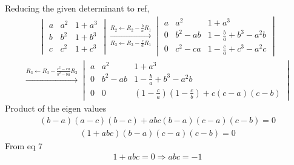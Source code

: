 \documentclass{beamer}
\theoremstyle{remark}
\newcommand{\mydet}[1]{\ensuremath{\begin{vmatrix}#1\end{vmatrix}}}
\numberwithin{equation}{section}
\begin{document}
Reducing the given determinant to ref,
\begin{align}
		\mydet{a &a^2 &1+ a^3\\ b & b^2 & 1 + b^3\\c & c^2 & 1 + c^3} \xrightarrow[R_3\leftarrow R_3-\frac{c}{a}R_1]{R_2\leftarrow R_2-\frac{b}{a}R_1} \mydet{a &a^2 &1+ a^3\\ 0 & b^2-ab & 1-\frac{b}{a} + b^3-a^2b\\0 & c^2-ca &1 -\frac{c}{a}  + c^3-a^2c }
\end{align}
\begin{align}
\xrightarrow[]{R_3\leftarrow R_3-\frac{c^2-ca}{b^2-ba}R_2} \mydet{a &a^2 &1+ a^3\\ 0 & b^2-ab & 1-\frac{b}{a} + b^3-a^2b\\0 & 0 & ( 1 -\frac{c}{a}) (1-\frac{c}{b})  + c(c-a)(c-b)}
\end{align}
Product of the eigen values 
\begin{align}
		(b-a)(a-c)(b-c)+abc(b-a)(c-a)(c-b) = 0 
\end{align}
\begin{align}
		(1+abc)(b-a)(c-a)(c-b) = 0 
\end{align}
From eq 7
\begin{align}
		1+abc = 0 \Rightarrow abc = -1 
\end{align}
\end{document}
